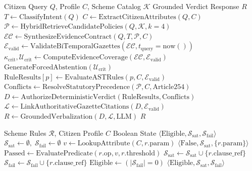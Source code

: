 \documentclass[conference]{IEEEtran}
\begin{document}
\begin{algorithm}[!t]
\caption{Evidence-Contracted Policy Reasoning (ECPR)}
\label{alg:ecpr}
\begin{algorithmic}[1]
\REQUIRE Citizen Query $Q$, Profile $C$, Scheme Catalog $\mathcal{K}$
\ENSURE Grounded Verdict Response $R$
\STATE $T \gets \text{ClassifyIntent}(Q)$
\STATE $C \gets \text{ExtractCitizenAttributes}(Q, C)$
\STATE $\mathcal{P} \gets \text{HybridRetrieveCandidatePolicies}(Q, \mathcal{K}, k=4)$
\STATE $\mathcal{EC} \gets \text{SynthesizeEvidenceContract}(Q, T, \mathcal{P}, C)$
\STATE $\mathcal{E}_{\text{valid}} \gets \text{ValidateBiTemporalGazettes}(\mathcal{EC}, t_{\text{query}}=\text{now}())$
\STATE $\kappa_{\text{crit}}, \mathcal{U}_{\text{crit}} \gets \text{ComputeEvidenceCoverage}(\mathcal{EC}, \mathcal{E}_{\text{valid}})$
    \RETURN $\text{GenerateForcedAbstention}(\mathcal{U}_{\text{crit}})$
\ENDIF
{}
    \STATE $\text{RuleResults}[p] \gets \text{EvaluateASTRules}(p, C, \mathcal{E}_{\text{valid}})$
\ENDFOR
\STATE $\text{Conflicts} \gets \text{ResolveStatutoryPrecedence}(\mathcal{P}, C, \text{Article254})$
\STATE $D \gets \text{AuthorizeDeterministicVerdict}(\text{RuleResults}, \text{Conflicts})$
\STATE $\mathcal{L} \gets \text{LinkAuthoritativeGazetteCitations}(D, \mathcal{E}_{\text{valid}})$
\STATE $R \gets \text{GroundedVerbalization}(D, \mathcal{L}, \text{LLM})$
\RETURN $R$
\end{algorithmic}
\end{algorithm}

\begin{algorithm}[!t]
\caption{Deterministic AST Boolean Rule Evaluator}
\label{alg:ast}
\begin{algorithmic}[1]
\REQUIRE Scheme Rules $\mathcal{R}$, Citizen Profile $C$
\ENSURE Boolean State $\langle \text{Eligible}, \mathcal{S}_{\text{sat}}, \mathcal{S}_{\text{fail}} \rangle$
\STATE $\mathcal{S}_{\text{sat}} \gets \emptyset, \; \mathcal{S}_{\text{fail}} \gets \emptyset$
    \STATE $v \gets \text{LookupAttribute}(C, r.\text{param})$
        \RETURN $\langle \text{False}, \mathcal{S}_{\text{sat}}, \{r.\text{param}\} \rangle$
    \ENDIF
    \STATE $\text{Passed} \gets \text{EvaluatePredicate}(r.\text{op}, v, r.\text{threshold})$
        \STATE $\mathcal{S}_{\text{sat}} \gets \mathcal{S}_{\text{sat}} \cup \{r.\text{clause\_ref}\}$
    \ELSE
        \STATE $\mathcal{S}_{\text{fail}} \gets \mathcal{S}_{\text{fail}} \cup \{r.\text{clause\_ref}\}$
    \ENDIF
\ENDFOR
\STATE $\text{Eligible} \gets (|\mathcal{S}_{\text{fail}}| = 0)$
\RETURN $\langle \text{Eligible}, \mathcal{S}_{\text{sat}}, \mathcal{S}_{\text{fail}} \rangle$
\end{algorithmic}
\end{algorithm}
\end{document}
